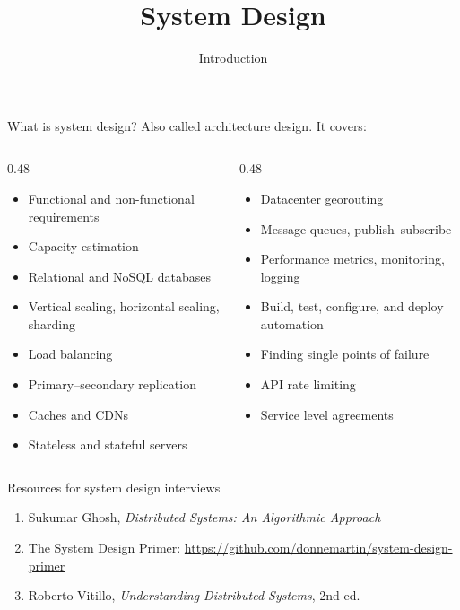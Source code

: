 \documentclass[aspectratio=169]{beamer}
\title{System Design}
\subtitle{Introduction}
\begin{document}
\maketitle

\begin{frame}{What is system design?}
  Also called architecture design. It covers:
  \begin{columns}[T]
    \begin{column}{0.48\textwidth}
      \small
      \begin{itemize}
        \item Functional and non-functional requirements
        \item Capacity estimation
        \item Relational and NoSQL databases
        \item Vertical scaling, horizontal scaling, sharding
        \item Load balancing
        \item Primary--secondary replication
        \item Caches and CDNs
        \item Stateless and stateful servers
      \end{itemize}
    \end{column}
    \begin{column}{0.48\textwidth}
      \small
      \begin{itemize}
        \item Datacenter georouting
        \item Message queues, publish--subscribe
        \item Performance metrics, monitoring, logging
        \item Build, test, configure, and deploy automation
        \item Finding single points of failure
        \item API rate limiting
        \item Service level agreements
      \end{itemize}
    \end{column}
  \end{columns}
\end{frame}

\begin{frame}{Resources for system design interviews}
  \begin{enumerate}
    \item Sukumar Ghosh, \emph{Distributed Systems: An Algorithmic Approach}
    \item The System Design Primer:
      \url{https://github.com/donnemartin/system-design-primer}
    \item Roberto Vitillo, \emph{Understanding Distributed Systems}, 2nd ed.
  \end{enumerate}
\end{frame}
\end{document}
